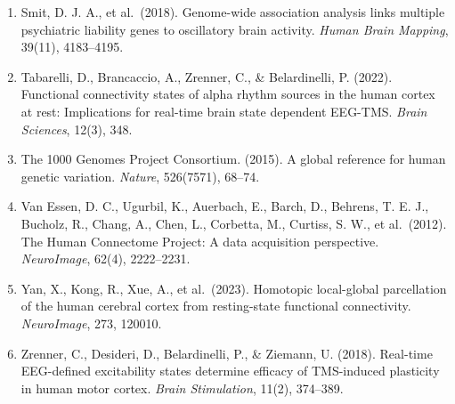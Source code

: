 \documentclass[
  11pt,
  letterpaper,
]{article}
\begin{document}
\begin{enumerate}
  (2005). Heritability of background EEG across the power spectrum.
  \emph{Psychophysiology}, 42(6), 691--697.
\item
  Smit, D. J. A., et al.~(2018). Genome-wide association analysis links
  multiple psychiatric liability genes to oscillatory brain activity.
  \emph{Human Brain Mapping}, 39(11), 4183--4195.
\item
  Tabarelli, D., Brancaccio, A., Zrenner, C., \& Belardinelli, P.
  (2022). Functional connectivity states of alpha rhythm sources in the
  human cortex at rest: Implications for real-time brain state dependent
  EEG-TMS. \emph{Brain Sciences}, 12(3), 348.
\item
  The 1000 Genomes Project Consortium. (2015). A global reference for
  human genetic variation. \emph{Nature}, 526(7571), 68--74.
\item
  Van Essen, D. C., Ugurbil, K., Auerbach, E., Barch, D., Behrens, T. E.
  J., Bucholz, R., Chang, A., Chen, L., Corbetta, M., Curtiss, S. W., et
  al.~(2012). The Human Connectome Project: A data acquisition
  perspective. \emph{NeuroImage}, 62(4), 2222--2231.
\item
  Yan, X., Kong, R., Xue, A., et al.~(2023). Homotopic local-global
  parcellation of the human cerebral cortex from resting-state
  functional connectivity. \emph{NeuroImage}, 273, 120010.
\item
  Zrenner, C., Desideri, D., Belardinelli, P., \& Ziemann, U. (2018).
  Real-time EEG-defined excitability states determine efficacy of
  TMS-induced plasticity in human motor cortex. \emph{Brain
  Stimulation}, 11(2), 374--389.
\end{enumerate}
\end{document}
